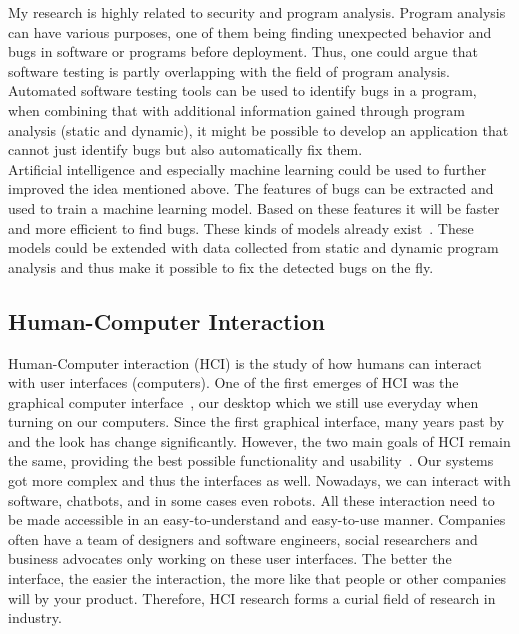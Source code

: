 \documentclass[11pt,a4paper]{article}
\begin{document}
My research is highly related to security and program analysis. Program analysis can have various purposes, one of them being finding unexpected behavior and bugs in software or programs before deployment. Thus, one could argue that software testing is partly overlapping with the field of program analysis. Automated software testing tools can be used to identify bugs in a program, when combining that with additional information gained through program analysis (static and dynamic), it might be possible to develop an application that cannot just identify bugs but also automatically fix them.\\

Artificial intelligence and especially machine learning could be used to further improved the idea mentioned above. The features of bugs can be extracted and used to train a machine learning model. Based on these features it will be faster and more efficient to find bugs. These kinds of models already exist~\cite{aleem2015benchmarking,immaculate2019software,pradel2018deepbugs}. These models could be extended with data collected from static and dynamic program analysis and thus make it possible to fix the detected bugs on the fly.

\subsection{Human-Computer Interaction\label{sec:human}}
Human-Computer interaction (HCI) is the study of how humans can interact with user interfaces (computers). One of the first emerges of HCI was the graphical computer interface~\cite{myers1998brief}, our desktop which we still use everyday when turning on our computers. Since the first graphical interface, many years past by and the look has change significantly. However, the two main goals of HCI remain the same, providing the best possible functionality and usability~\cite{karray2008human}. Our systems got more complex and thus the interfaces as well. Nowadays, we can interact with software, chatbots, and in some cases even robots. All these interaction need to be made accessible in an easy-to-understand and easy-to-use manner. Companies often have a team of designers and software engineers, social researchers and business advocates only working on these user interfaces. The better the interface, the easier the interaction, the more like that people or other companies will by your product. Therefore, HCI research forms a curial field of research in industry.\\
\end{document}
